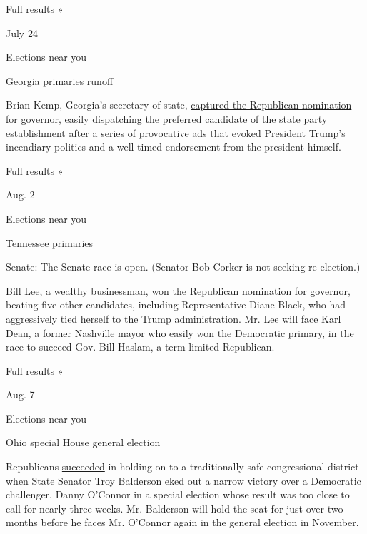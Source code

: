 \href{https://www.nytimes3xbfgragh.onion/interactive/2018/07/17/us/elections/results-alabama-primary-runoff-elections.html}{Full
results »}

July 24

Elections near you

Georgia primaries runoff

Brian Kemp, Georgia's secretary of state,
\href{https://www.nytimes3xbfgragh.onion/2018/07/24/us/politics/kemp-cagle-georgia.html}{captured
the Republican nomination for governor}, easily dispatching the
preferred candidate of the state party establishment after a series of
provocative ads that evoked President Trump's incendiary politics and a
well-timed endorsement from the president himself.

\href{https://www.nytimes3xbfgragh.onion/interactive/2018/07/24/us/elections/results-georgia-primary-runoff-elections.html}{Full
results »}

Aug. 2

Elections near you

Tennessee primaries

Senate: The Senate race is open. (Senator Bob Corker is not seeking
re-election.)

Bill Lee, a wealthy businessman,
\href{https://www.nytimes3xbfgragh.onion/2018/08/02/us/politics/tennessee-primary.html}{won
the Republican nomination for governor}, beating five other candidates,
including Representative Diane Black, who had aggressively tied herself
to the Trump administration. Mr. Lee will face Karl Dean, a former
Nashville mayor who easily won the Democratic primary, in the race to
succeed Gov. Bill Haslam, a term-limited Republican.

\href{https://www.nytimes3xbfgragh.onion/interactive/2018/08/02/us/elections/results-tennessee-primary-elections.html}{Full
results »}

Aug. 7

Elections near you

Ohio special House general election

Republicans
\href{https://www.nytimes3xbfgragh.onion/2018/08/24/us/politics/troy-balderson-ohio.html}{succeeded}
in holding on to a traditionally safe congressional district when State
Senator Troy Balderson eked out a narrow victory over a Democratic
challenger, Danny O'Connor in a special election whose result was too
close to call for nearly three weeks. Mr. Balderson will hold the seat
for just over two months before he faces Mr. O'Connor again in the
general election in November.

